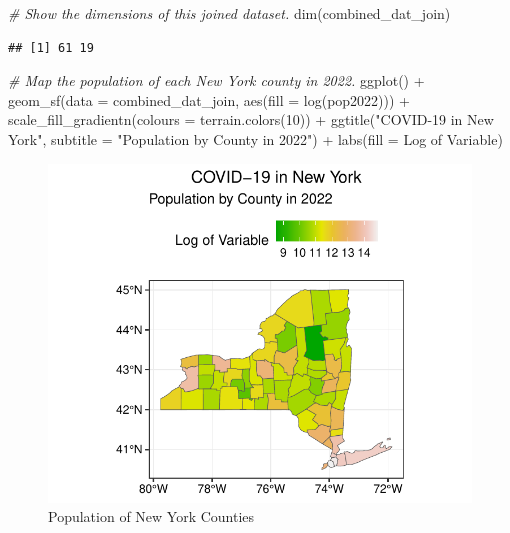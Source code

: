 \documentclass[
  12pt,
]{article}
\newenvironment{Shaded}{\begin{snugshade}}{\end{snugshade}}
\newcommand{\AttributeTok}[1]{\textcolor[rgb]{0.77,0.63,0.00}{#1}}
\newcommand{\CommentTok}[1]{\textcolor[rgb]{0.56,0.35,0.01}{\textit{#1}}}
\newcommand{\DecValTok}[1]{\textcolor[rgb]{0.00,0.00,0.81}{#1}}
\newcommand{\FunctionTok}[1]{\textcolor[rgb]{0.00,0.00,0.00}{#1}}
\newcommand{\NormalTok}[1]{#1}
\newcommand{\SpecialCharTok}[1]{\textcolor[rgb]{0.00,0.00,0.00}{#1}}
\newcommand{\StringTok}[1]{\textcolor[rgb]{0.31,0.60,0.02}{#1}}
\begin{document}
\begin{Shaded}
\begin{Highlighting}[]
\CommentTok{\# Show the dimensions of this joined dataset.}
\FunctionTok{dim}\NormalTok{(combined\_dat\_join)}
\end{Highlighting}
\end{Shaded}

\begin{verbatim}
## [1] 61 19
\end{verbatim}

\begin{Shaded}
\begin{Highlighting}[]
\CommentTok{\# Map the population of each New York county in 2022.}
\FunctionTok{ggplot}\NormalTok{() }\SpecialCharTok{+}
  \FunctionTok{geom\_sf}\NormalTok{(}\AttributeTok{data =}\NormalTok{ combined\_dat\_join, }\FunctionTok{aes}\NormalTok{(}\AttributeTok{fill =} \FunctionTok{log}\NormalTok{(pop2022))) }\SpecialCharTok{+}
  \FunctionTok{scale\_fill\_gradientn}\NormalTok{(}\AttributeTok{colours =} \FunctionTok{terrain.colors}\NormalTok{(}\DecValTok{10}\NormalTok{)) }\SpecialCharTok{+}
  \FunctionTok{ggtitle}\NormalTok{(}\StringTok{"COVID{-}19 in New York"}\NormalTok{,}
          \AttributeTok{subtitle =} \StringTok{"Population by County in 2022"}\NormalTok{) }\SpecialCharTok{+}
  \FunctionTok{labs}\NormalTok{(}\AttributeTok{fill =} \StringTok{\textquotesingle{}Log of Variable\textquotesingle{}}\NormalTok{)}
\end{Highlighting}
\end{Shaded}

\begin{figure}

{\centering \includegraphics{EDA_Final_Group_Project_files/figure-latex/unnamed-chunk-15-1} 

}

\caption{Population of New York Counties}\label{fig:unnamed-chunk-15}
\end{figure}
\end{document}
